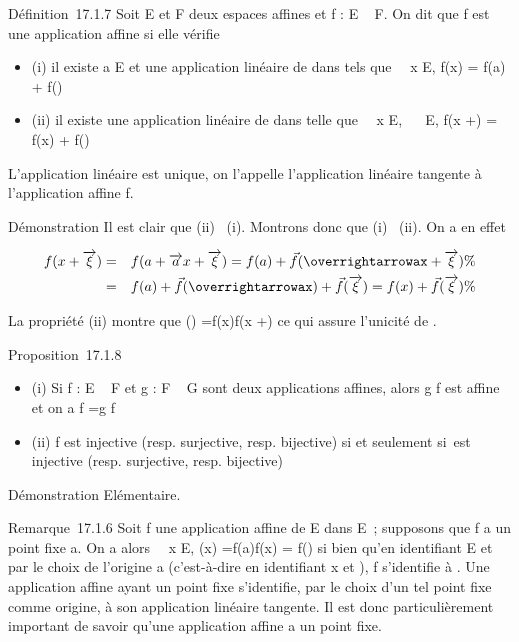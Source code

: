 \documentclass[]{article}
\begin{document}
Définition~17.1.7 Soit E et F deux espaces affines et f : E \rightarrow~ F. On dit
que f est une application affine si elle vérifie

\begin{itemize}
\itemsep1pt\parskip0pt
\item
  (i) il existe a \in E et une application linéaire
  \vecf de \overrightarrowE dans
  \overrightarrowF tels que
  \forall~~x \in E, f(x) = f(a) +\vec
  f(\overrightarrowax)
\item
  (ii) il existe une application linéaire \vecf de
  \overrightarrowE dans
  \overrightarrowF telle que
  \forall~~x \in E,
  \forall~\overrightarrow\xi~
  \in\overrightarrow E, f(x
  +\overrightarrow \xi) = f(x) +\vec
  f(\overrightarrow\xi)
\end{itemize}

L'application linéaire \vecf est unique, on l'appelle
l'application linéaire tangente à l'application affine f.

Démonstration Il est clair que (ii) \rigtharrow~(i). Montrons donc que (i) \rigtharrow~(ii).
On a en effet

\begin{align*} f(x +\overrightarrow
\xi)& =& f(a +\overrightarrow ax
+\overrightarrow \xi) = f(a) +\vec
f(\overrightarrowax
+\overrightarrow \xi) \%&
\\ & =& f(a) +\vec
f(\overrightarrowax) +\vec
f(\overrightarrow\xi) = f(x) +\vec
f(\overrightarrow\xi)\%&
\\ \end{align*}

La propriété (ii) montre que
\vecf(\overrightarrow\xi)
=\overrightarrow f(x)f(x
+\overrightarrow \xi) ce qui assure l'unicité de
\vecf.

Proposition~17.1.8

\begin{itemize}
\itemsep1pt\parskip0pt
\item
  (i) Si f : E \rightarrow~ F et g : F \rightarrow~ G sont deux applications affines, alors g
  \cdot f est affine et on a \overrightarrowg \cdot f
  =\vec g \cdot\vec f
\item
  (ii) f est injective (resp. surjective, resp. bijective) si et
  seulement si~\vecf est injective (resp. surjective,
  resp. bijective)
\end{itemize}

Démonstration Elémentaire.

Remarque~17.1.6 Soit f une application affine de E dans E~; supposons
que f a un point fixe a. On a alors \forall~~x \in E,
\overrightarrowaf(x)
=\overrightarrow f(a)f(x) =\vec
f(\overrightarrowax) si bien qu'en identifiant E et
\overrightarrowE par le choix de l'origine a
(c'est-à-dire en identifiant x et \overrightarrowax),
f s'identifie à \vecf. Une application affine ayant
un point fixe s'identifie, par le choix d'un tel point fixe comme
origine, à son application linéaire tangente. Il est donc
particulièrement important de savoir qu'une application affine a un
point fixe.
\end{document}

